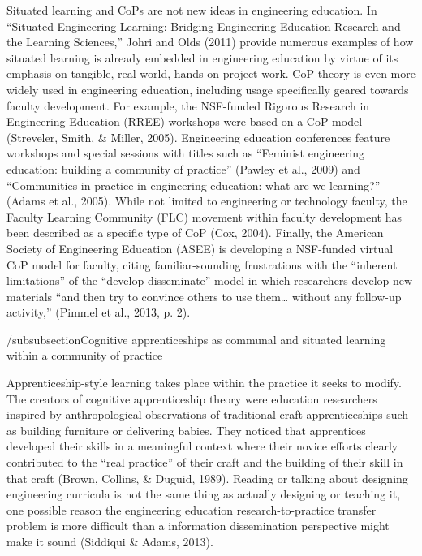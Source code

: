Situated learning and CoPs are not new ideas in engineering education. In “Situated Engineering Learning: Bridging Engineering Education Research and the Learning Sciences,” Johri and Olds (2011) provide numerous examples of how situated learning is already embedded in engineering education by virtue of its emphasis on tangible, real-world, hands-on project work. CoP theory is even more widely used in engineering education, including usage specifically geared towards faculty development. For example, the NSF-funded Rigorous Research in Engineering Education (RREE) workshops were based on a CoP model (Streveler, Smith, & Miller, 2005). Engineering education conferences feature workshops and special sessions with titles such as “Feminist engineering education: building a community of practice” (Pawley et al., 2009) and “Communities in practice in engineering education: what are we learning?” (Adams et al., 2005). While not limited to engineering or technology faculty, the Faculty Learning Community (FLC) movement within faculty development has been described as a specific type of CoP (Cox, 2004). Finally, the American Society of Engineering Education (ASEE) is developing a NSF-funded virtual CoP model for faculty, citing familiar-sounding frustrations with the “inherent limitations” of the “develop-disseminate” model in which researchers develop new materials “and then try to convince others to use them… without any follow-up activity,” (Pimmel et al., 2013, p. 2).

/subsubsection{Cognitive apprenticeships as communal and situated learning within a community of practice}

Apprenticeship-style learning takes place within the practice it seeks to modify. The creators of cognitive apprenticeship theory were education researchers inspired by anthropological observations of traditional craft apprenticeships such as building furniture or delivering babies. They noticed that apprentices developed their skills in a meaningful context where their novice efforts clearly contributed to the “real practice” of their craft and the building of their skill in that craft (Brown, Collins, & Duguid, 1989). Reading or talking about designing engineering curricula is not the same thing as actually designing or teaching it, one possible reason the engineering education research-to-practice transfer problem is more difficult than a information dissemination perspective might make it sound (Siddiqui & Adams, 2013).

